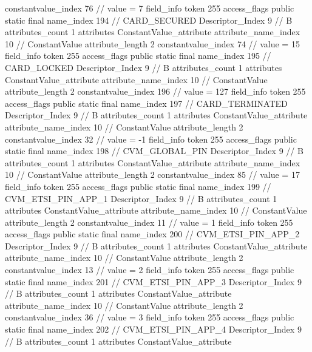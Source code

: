 {{{{{{{					constantvalue_index	76		// value = 7
				}
				}
			}
			field_info {
				token	255
				access_flags	public static final
				name_index	194		// CARD_SECURED
				Descriptor_Index	9		// B
				attributes_count	1
				attributes {
				ConstantValue_attribute {
					attribute_name_index	10		// ConstantValue
					attribute_length	2
					constantvalue_index	74		// value = 15
				}
				}
			}
			field_info {
				token	255
				access_flags	public static final
				name_index	195		// CARD_LOCKED
				Descriptor_Index	9		// B
				attributes_count	1
				attributes {
				ConstantValue_attribute {
					attribute_name_index	10		// ConstantValue
					attribute_length	2
					constantvalue_index	196		// value = 127
				}
				}
			}
			field_info {
				token	255
				access_flags	public static final
				name_index	197		// CARD_TERMINATED
				Descriptor_Index	9		// B
				attributes_count	1
				attributes {
				ConstantValue_attribute {
					attribute_name_index	10		// ConstantValue
					attribute_length	2
					constantvalue_index	32		// value = -1
				}
				}
			}
			field_info {
				token	255
				access_flags	public static final
				name_index	198		// CVM_GLOBAL_PIN
				Descriptor_Index	9		// B
				attributes_count	1
				attributes {
				ConstantValue_attribute {
					attribute_name_index	10		// ConstantValue
					attribute_length	2
					constantvalue_index	85		// value = 17
				}
				}
			}
			field_info {
				token	255
				access_flags	public static final
				name_index	199		// CVM_ETSI_PIN_APP_1
				Descriptor_Index	9		// B
				attributes_count	1
				attributes {
				ConstantValue_attribute {
					attribute_name_index	10		// ConstantValue
					attribute_length	2
					constantvalue_index	11		// value = 1
				}
				}
			}
			field_info {
				token	255
				access_flags	public static final
				name_index	200		// CVM_ETSI_PIN_APP_2
				Descriptor_Index	9		// B
				attributes_count	1
				attributes {
				ConstantValue_attribute {
					attribute_name_index	10		// ConstantValue
					attribute_length	2
					constantvalue_index	13		// value = 2
				}
				}
			}
			field_info {
				token	255
				access_flags	public static final
				name_index	201		// CVM_ETSI_PIN_APP_3
				Descriptor_Index	9		// B
				attributes_count	1
				attributes {
				ConstantValue_attribute {
					attribute_name_index	10		// ConstantValue
					attribute_length	2
					constantvalue_index	36		// value = 3
				}
				}
			}
			field_info {
				token	255
				access_flags	public static final
				name_index	202		// CVM_ETSI_PIN_APP_4
				Descriptor_Index	9		// B
				attributes_count	1
				attributes {
				ConstantValue_attribute {
}}}}}}}
